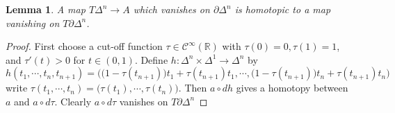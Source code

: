 \documentclass[12pt]{amsart}
\newtheorem{lem}[thm]{Lemma}
\theoremstyle{definition}
\theoremstyle{remark}
\numberwithin{equation}{section}
\newcommand{\del}{\partial}
\renewcommand{\del}{\partial}
\newcommand{\cinf}{{\mathcal C}^{\infty}}
\newcommand{\R}{{\mathbb{R}}}
\newcommand{\1}{{\mathbb{1}}}
\begin{document}
\begin{lem}
    A map $T\Delta^n \to A$ which vanishes on $\del \Delta^n$ is homotopic to a map vanishing on $T\del \Delta^n$.
\end{lem}

\begin{proof}
    First choose a cut-off function $\tau \in \cinf(\R)$ with $\tau(0)=0, \tau(1) = 1$, and $\tau'(t) > 0$ for $t \in (0,1)$.
    Define $h: \Delta^n \times \Delta^1 \to \Delta^n$ by
    $$
    h(t_1,\cdots,t_n, t_{n+1}) = \Big(\big(1-\tau(t_{n+1}) \big)t_1 + \tau(t_{n+1})t_1, \cdots, \big(1-\tau(t_{n+1}) \big)t_n + \tau(t_{n+1})t_n \Big)
    $$
    write $\tau(t_1,\cdots, t_n) = \big( \tau(t_1), \cdots, \tau(t_n)\big).$ Then $ a\circ dh$ gives a homotopy between $a$ and $a\circ d\tau$. Clearly $a\circ d\tau$ vanishes on $T \del\Delta^n$
\end{proof}
\end{document}
